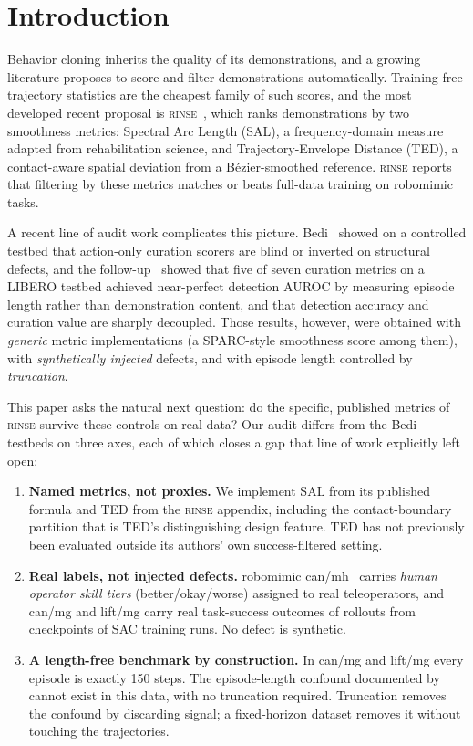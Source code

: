 \documentclass[10pt]{article}
\newcommand{\rinse}{\textmd{\textsc{rinse}}}
\begin{document}
\section{Introduction}

Behavior cloning inherits the quality of its demonstrations, and a growing
literature proposes to score and filter demonstrations automatically.
Training-free trajectory statistics are the cheapest family of such scores,
and the most developed recent proposal is \rinse{}~\citep{rinse}, which ranks
demonstrations by two smoothness metrics: Spectral Arc Length (SAL), a
frequency-domain measure adapted from rehabilitation science, and
Trajectory-Envelope Distance (TED), a contact-aware spatial deviation from a
B\'ezier-smoothed reference. \rinse{} reports that filtering by these metrics
matches or beats full-data training on robomimic tasks.

A recent line of audit work complicates this picture.
Bedi~\citep{bedi-audit} showed on a controlled testbed that action-only
curation scorers are blind or inverted on structural defects, and the
follow-up~\citep{bedi-policy} showed that five of seven curation metrics on a
LIBERO testbed achieved near-perfect detection AUROC by measuring episode
length rather than demonstration content, and that detection accuracy and
curation value are sharply decoupled. Those results, however, were obtained
with \emph{generic} metric implementations (a SPARC-style smoothness score
among them), with \emph{synthetically injected} defects, and with episode
length controlled by \emph{truncation}.

This paper asks the natural next question: do the specific, published metrics
of \rinse{} survive these controls on real data? Our audit differs from the
Bedi testbeds on three axes, each of which closes a gap that line of work
explicitly left open:

\begin{enumerate}
\item \textbf{Named metrics, not proxies.} We implement SAL from its
published formula and TED from the \rinse{} appendix, including the
contact-boundary partition that is TED's distinguishing design feature. TED
has not previously been evaluated outside its authors' own
success-filtered setting.
\item \textbf{Real labels, not injected defects.} robomimic
can/mh~\citep{robomimic} carries \emph{human operator skill tiers}
(better/okay/worse) assigned to real teleoperators, and can/mg and lift/mg
carry real task-success outcomes of rollouts from checkpoints of SAC
training runs. No defect is synthetic.
\item \textbf{A length-free benchmark by construction.} In can/mg and
lift/mg every episode is exactly 150 steps. The episode-length confound documented
by~\citep{bedi-policy} cannot exist in this data, with no truncation
required. Truncation removes the confound by discarding signal; a
fixed-horizon dataset removes it without touching the trajectories.
\end{enumerate}
\end{document}

